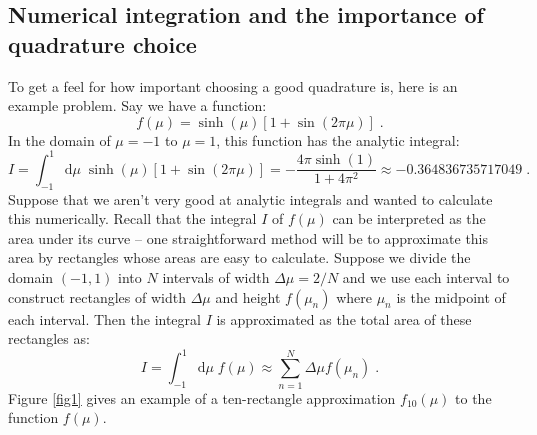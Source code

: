 \documentclass{article}
\begin{document}
\subsection{Numerical integration and the importance of quadrature choice}

To get a feel for how important choosing a good quadrature is, here is an example problem. Say we have a function:
\begin{equation}
	f(\mu) = \sinh(\mu)\left[1+\sin(2\pi \mu)\right]\;\mathrm{.}
\end{equation}
In the domain of $\mu=-1$ to $\mu=1$, this function has the analytic integral:
\begin{equation}
	I = \int^1_{-1}\mathrm{d}\mu\;\sinh(\mu)\left[1+\sin(2\pi \mu)\right] = -\frac{4\pi \sinh(1)}{1+4\pi^2}\approx -0.364836735717049\;\mathrm{.}
\end{equation}
Suppose that we aren't very good at analytic integrals and wanted to calculate this numerically. Recall that the integral $I$ of $f(\mu)$ can be interpreted as the area under its curve -- one straightforward method will be to approximate this area by rectangles whose areas are easy to calculate. Suppose we divide the domain $(-1,1)$ into $N$ intervals of width $\Delta \mu = 2/N$ and we use each interval to construct rectangles of width $\Delta \mu$ and height $f(\mu_n)$ where $\mu_n$ is the midpoint of each interval. Then the integral $I$ is approximated as the total area of these rectangles as:
\begin{equation}\label{SN3}
	I = \int^1_{-1}\mathrm{d}\mu\;f(\mu)\approx \sum^N_{n=1}\Delta \mu f(\mu_n)\;\mathrm{.}
\end{equation}
Figure \ref{fig1} gives an example of a ten-rectangle approximation $f_{10}(\mu)$ to the function $f(\mu)$.
\end{document}
